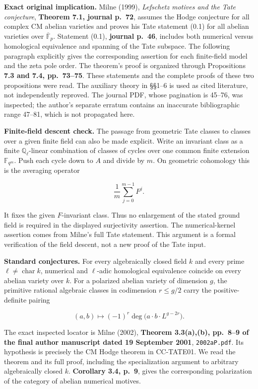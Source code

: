 \documentclass[11pt,a4paper]{article}
\theoremstyle{definition}\newtheorem{definition}[theorem]{Definition}
\theoremstyle{remark}\newtheorem{remark}[theorem]{Remark}
\begin{document}
\textbf{Exact original implication.} Milne (1999), \emph{Lefschetz
motives and the Tate conjecture}, \textbf{Theorem 7.1, journal p.~72},
assumes the Hodge conjecture for all complex CM abelian varieties and
proves his Tate statement (0.1) for all abelian varieties over
\(\overline{\mathbb F}_p\). Statement (0.1), \textbf{journal p.~46},
includes both numerical versus homological equivalence and spanning of
the Tate subspace. The following paragraph explicitly gives the
corresponding assertion for each finite-field model and the zeta pole
order. The theorem's proof is organized through Propositions \textbf{7.3
and 7.4, pp.~73--75}. These statements and the complete proofs of these
two propositions were read. The auxiliary theory in §§1--6 is used as
cited literature, not independently reproved. The journal PDF, whose
pagination is 45--76, was inspected; the author's separate erratum
contains an inaccurate bibliographic range 47--81, which is not
propagated here.

\textbf{Finite-field descent check.} The passage from geometric Tate
classes to classes over a given finite field can also be made explicit.
Write an invariant class as a finite \(\mathbb Q_\ell\)-linear
combination of classes of cycles over one common finite extension
\(\mathbb F_{q^m}\). Push each cycle down to \(A\) and divide by \(m\).
On geometric cohomology this is the averaging operator

\[
\frac1m\sum_{j=0}^{m-1}F^j.
\]

It fixes the given \(F\)-invariant class. Thus no enlargement of the
stated ground field is required in the displayed surjectivity assertion.
The numerical-kernel assertion comes from Milne's full Tate statement.
This argument is a formal verification of the field descent, not a new
proof of the Tate input.

\textbf{Standard conjectures.} For every algebraically closed field
\(k\) and every prime \(\ell\ne\operatorname{char}k\), numerical and
\(\ell\)-adic homological equivalence coincide on every abelian variety
over \(k\). For a polarized abelian variety of dimension \(g\), the
primitive rational algebraic classes in codimension \(r\le g/2\) carry
the positive-definite pairing

\[
(a,b)\longmapsto(-1)^r\deg\bigl(a\cdot b\cdot L^{g-2r}\bigr).
\]

The exact inspected locator is Milne (2002), \textbf{Theorem 3.3(a),(b),
pp.~8--9 of the final author manuscript dated 19 September 2001},
\nolinkurl{2002aP.pdf}. Its hypothesis is precisely the CM Hodge theorem in
CC-TATE01. We read the theorem and its full proof, including the
specialization argument to arbitrary algebraically closed \(k\).
\textbf{Corollary 3.4, p.~9}, gives the corresponding polarization of
the category of abelian numerical motives.
\end{document}

